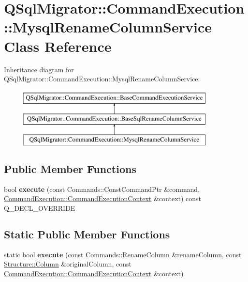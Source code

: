 \hypertarget{class_q_sql_migrator_1_1_command_execution_1_1_mysql_rename_column_service}{}\section{Q\+Sql\+Migrator\+:\+:Command\+Execution\+:\+:Mysql\+Rename\+Column\+Service Class Reference}
\label{class_q_sql_migrator_1_1_command_execution_1_1_mysql_rename_column_service}
Inheritance diagram for Q\+Sql\+Migrator\+:\+:Command\+Execution\+:\+:Mysql\+Rename\+Column\+Service\+:\begin{figure}[H]
\begin{center}
\leavevmode
\includegraphics[height=3.000000cm]{class_q_sql_migrator_1_1_command_execution_1_1_mysql_rename_column_service}
\end{center}
\end{figure}
\subsection*{Public Member Functions}
\begin{DoxyCompactItemize}
\item 
\mbox{\label{class_q_sql_migrator_1_1_command_execution_1_1_mysql_rename_column_service_a610b7fe2fce4bf5b95c0f38874d8774a}} 
bool {\bfseries execute} (const Commands\+::\+Const\+Command\+Ptr \&command, \hyperlink{class_q_sql_migrator_1_1_command_execution_1_1_command_execution_context}{Command\+Execution\+::\+Command\+Execution\+Context} \&context) const Q\+\_\+\+D\+E\+C\+L\+\_\+\+O\+V\+E\+R\+R\+I\+DE
\end{DoxyCompactItemize}
\subsection*{Static Public Member Functions}
\begin{DoxyCompactItemize}
\item 
\mbox{\label{class_q_sql_migrator_1_1_command_execution_1_1_mysql_rename_column_service_a7449dc85ce2c8a241bcb7fcdeb70946f}} 
static bool {\bfseries execute} (const \hyperlink{class_q_sql_migrator_1_1_commands_1_1_rename_column}{Commands\+::\+Rename\+Column} \&rename\+Column, const \hyperlink{class_q_sql_migrator_1_1_structure_1_1_column}{Structure\+::\+Column} \&original\+Column, const \hyperlink{class_q_sql_migrator_1_1_command_execution_1_1_command_execution_context}{Command\+Execution\+::\+Command\+Execution\+Context} \&context)
\end{DoxyCompactItemize}
